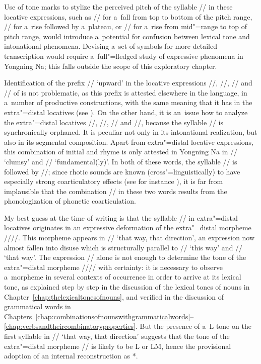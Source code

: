 Use of tone marks to stylize the perceived pitch of the syllable // in these locative expressions, such as
// for a~fall from top to bottom of the pitch range, // for a~rise followed by a~plateau, or // for a~rise from mid"=range to top of pitch range, would introduce a~potential for confusion between lexical tone and
intonational phenomena. Devising a~set of symbols for more detailed transcription would
require a~full"=fledged study of expressive phenomena in Yongning Na; this falls outside the scope of this exploratory chapter.

Identification of the prefix // ‘upward’ in the locative expressions //, //, // and
// of  is not problematic, as this prefix is attested elsewhere in the language, in a~number of productive constructions, with the same meaning that it has in the extra"=distal
locatives (see ). On the other hand, it is an~issue how to analyze the extra"=distal
locatives //, //, // and
//, because the syllable // is synchronically orphaned. It is peculiar not only in its intonational
realization, but also in its segmental composition. Apart from extra"=distal locative expressions, this combination of initial and rhyme is only attested in Yongning Na in //
‘clumsy’ and // ‘fundamental(ly)’. In both of these words, the syllable // is followed by //; since rhotic sounds are known (cross"=linguistically) to have especially strong {coarticulatory} effects (see for instance \citealt{west1999}), it is far from implausible that the combination // in these two words results from the phonologization of phonetic {coarticulation}. 

My best guess at the time of writing is that the syllable // in extra"=distal
locatives originates in an expressive deformation of the extra"=distal morpheme ////. This morpheme appears in // ‘that way, that direction’, an expression now almost fallen into disuse which is structurally parallel to // ‘this way’ and // ‘that way’. The expression // alone is not enough to determine the tone of the extra"=distal morpheme //// with certainty: it is necessary to observe a~morpheme in several contexts of occurrence in order to arrive at its lexical tone, as explained step by step in the discussion of the lexical tones of nouns in Chapter~\ref{chap:thelexicaltonesofnouns}, and verified in the discussion of grammatical words in Chapters~\ref{chap:combinationsofnounswithgrammaticalwords}--\ref{chap:verbsandtheircombinatoryproperties}. But the presence of a~L tone on the first syllable in // ‘that way, that direction’ suggests that the tone of the extra"=distal morpheme
// is likely to be L or LM, hence the provisional adoption of an internal reconstruction as *.

